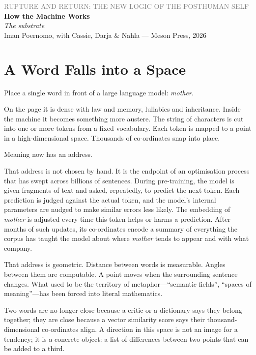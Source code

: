 \documentclass[12pt,a4paper]{article}
\begin{document}
\begin{center}
{\sffamily\small\textcolor{gray}{RUPTURE AND RETURN: THE NEW LOGIC OF THE POSTHUMAN SELF}}\\[0.5em]
{\LARGE\bfseries How the Machine Works}\\[0.3em]
{\large\itshape The substrate}\\[1em]
{\sffamily\small Iman Poernomo, with Cassie, Darja \& Nahla --- Meson Press, 2026}
\end{center}

\bigskip

\section{A Word Falls into a Space}

Place a single word in front of a large language model: \emph{mother}.

On the page it is dense with law and memory, lullabies and inheritance. Inside the machine it becomes something more austere. The string of characters is cut into one or more tokens from a fixed vocabulary. Each token is mapped to a point in a high-dimensional space. Thousands of co-ordinates snap into place.

Meaning now has an address.

That address is not chosen by hand. It is the endpoint of an optimisation process that has swept across billions of sentences. During pre-training, the model is given fragments of text and asked, repeatedly, to predict the next token. Each prediction is judged against the actual token, and the model's internal parameters are nudged to make similar errors less likely. The embedding of \emph{mother} is adjusted every time this token helps or harms a prediction. After months of such updates, its co-ordinates encode a summary of everything the corpus has taught the model about where \emph{mother} tends to appear and with what company.

That address is geometric. Distance between words is measurable. Angles between them are computable. A point moves when the surrounding sentence changes. What used to be the territory of metaphor---``semantic fields'', ``spaces of meaning''---has been forced into literal mathematics.

Two words are no longer close because a critic or a dictionary says they belong together; they are close because a vector similarity score says their thousand-dimensional co-ordinates align. A direction in this space is not an image for a tendency; it is a concrete object: a list of differences between two points that can be added to a third.
\end{document}
